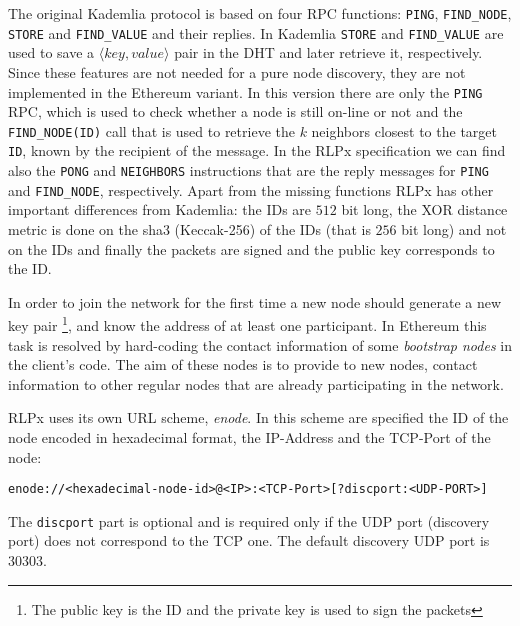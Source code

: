 The original Kademlia protocol is based on four RPC functions:
\verb|PING|, \verb|FIND_NODE|,
\verb|STORE| and \verb|FIND_VALUE| and their replies.
In Kademlia \verb|STORE| and \verb|FIND_VALUE| are used to save a
$\langle key, value\rangle$ pair in the DHT and later retrieve it, respectively.
Since these features are not needed for a pure node discovery, they
are not implemented in the Ethereum variant.
In this version there are only the \verb|PING| RPC, which is used to 
check whether a
node is still on-line or not and the \verb|FIND_NODE(ID)| call that is used to
retrieve the $k$ neighbors closest to the target \verb|ID|, known by the
recipient of the message. In the RLPx specification we can find also
the \verb|PONG| and \verb|NEIGHBORS| instructions that are the reply messages
for \verb|PING| and \verb|FIND_NODE|, respectively.
Apart from the missing functions RLPx has other important differences
from Kademlia:
the IDs are $512$ bit long, the XOR distance metric is done on the sha3
(Keccak-256) of the IDs (that is $256$ bit long) and not on the IDs and
finally the packets are signed and the public key corresponds to the ID.

In order to join the network for the first time a new node should
generate a new key pair
\footnote{The public key is the ID and the private key is used to sign the packets}, and
know the address of at least one participant.
In Ethereum this task is resolved by hard-coding the contact information
of some \textit{bootstrap nodes} in the client's code.
The aim of these nodes is to provide to new nodes, contact information to
other regular nodes that are already participating in the network.

RLPx uses its own URL scheme, \emph{enode}.
In this scheme are specified the ID of the node encoded in hexadecimal format,
the IP-Address and the TCP-Port of the node:
\begin{verbatim}
enode://<hexadecimal-node-id>@<IP>:<TCP-Port>[?discport:<UDP-PORT>]
\end{verbatim}
The \verb|discport| part is optional and is required only if the
UDP port (discovery port) does not correspond to the TCP one.
The default discovery UDP port is 30303.

